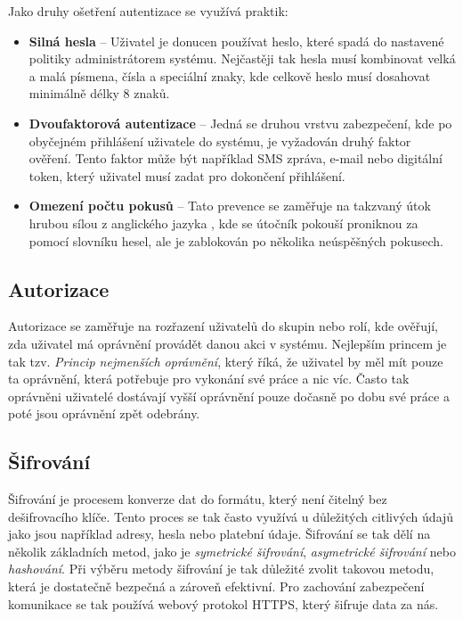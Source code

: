 \noindent
Jako druhy ošetření autentizace se využívá praktik:
\begin{itemize}
    \item \textbf{Silná hesla} -- Uživatel je donucen používat heslo, které spadá do nastavené politiky administrátorem systému. Nejčastěji tak hesla musí kombinovat velká a malá písmena, čísla a speciální znaky, kde celkově heslo musí dosahovat minimálně délky 8 znaků.
    \item \textbf{Dvoufaktorová autentizace} -- Jedná se druhou vrstvu zabezpečení, kde po obyčejném přihlášení uživatele do systému, je vyžadován druhý faktor ověření. Tento faktor může být například SMS zpráva, e-mail nebo digitální token, který uživatel musí zadat pro dokončení přihlášení.
    \item \textbf{Omezení počtu pokusů} -- Tato prevence se zaměřuje na takzvaný útok hrubou sílou z anglického jazyka \textit{}, kde se útočník pokouší proniknou za pomocí slovníku hesel, ale je zablokován po několika neúspěšných pokusech.
\end{itemize}

\subsection{Autorizace}
\label{subsec:security-authorization}
Autorizace se zaměřuje na rozřazení uživatelů do skupin nebo rolí, kde ověřují, zda uživatel má oprávnění provádět danou akci v systému. Nejlepším princem je tak tzv. \textit{Princip nejmenších oprávnění}, který říká, že uživatel by měl mít pouze ta oprávnění, která potřebuje pro vykonání své práce a nic víc. Často tak oprávněni uživatelé dostávají vyšší oprávnění pouze dočasně po dobu své práce a poté jsou oprávnění zpět odebrány.

\subsection{Šifrování}
\label{subsec:security-encryption}
Šifrování je procesem konverze dat do formátu, který není čitelný bez dešifrovacího klíče. Tento proces se tak často využívá u důležitých citlivých údajů jako jsou například adresy, hesla nebo platební údaje. Šifrování se tak dělí na několik základních metod, jako je \textit{symetrické šifrování}, \textit{asymetrické šifrování} nebo \textit{hashování}. Při výběru metody šifrování je tak důležité zvolit takovou metodu, která je dostatečně bezpečná a zároveň efektivní. Pro zachování zabezpečení komunikace se tak používá webový protokol HTTPS, který šifruje data za nás.

